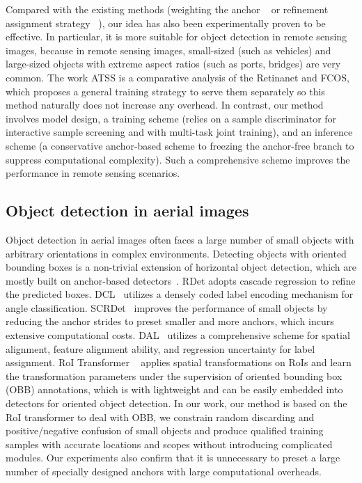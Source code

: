 \documentclass[journal]{IEEEtran}
\begin{document}
 Compared with the existing methods (weighting the anchor ~\cite{MetaAnchor, Zhu2020SoftAO} or refinement assignment strategy ~\cite{9009487, ming2020dynamic}), our idea has also been experimentally proven to be effective. In particular, it is more suitable for object detection in remote sensing images, because in remote sensing images, small-sized (such as vehicles) and large-sized objects with extreme aspect ratios (such as ports, bridges) are very common. The work ATSS \cite{2020Bridging} is a comparative analysis of the Retinanet and FCOS, which proposes a general training strategy to serve them separately so this method naturally does not increase any overhead. In contrast, our method involves model design, a training scheme (relies on a sample discriminator for interactive sample screening and with multi-task joint training), and an inference scheme (a conservative anchor-based scheme to freezing the anchor-free branch to suppress computational complexity). Such a comprehensive scheme improves the performance in remote sensing scenarios. 
 
\subsection{Object detection in aerial images} Object detection in aerial images often faces a large number of small objects with arbitrary orientations in complex environments. Detecting objects with oriented bounding boxes is a non-trivial extension of horizontal object detection, which are mostly built on anchor-based detectors~\cite{ma2018arbitrary,liu2016ship,liao2018textboxes++, ding2019learning}. 
RDet \cite{yang2019r3det} adopts cascade regression to refine the predicted boxes.  DCL~\cite{yang2020dense} utilizes a densely coded label encoding mechanism for angle classification. SCRDet~\cite{yang2019scrdet} improves the performance of small objects by reducing the anchor strides to preset smaller and more anchors, which incurs extensive computational costs.  DAL~\cite{ming2020dynamic} utilizes a comprehensive scheme for spatial alignment, feature alignment ability, and regression uncertainty for label assignment. RoI Transformer ~\cite{ding2019learning} applies spatial transformations on RoIs
and learn the transformation parameters under the supervision of oriented bounding box (OBB) annotations, which is with lightweight and can be easily embedded into detectors for oriented object detection. In our work, our method is based on the RoI transformer to deal with OBB, we constrain random discarding and positive/negative confusion of small objects and produce qualified training samples with accurate locations and scopes without introducing complicated modules. Our experiments also confirm that it is unnecessary to preset a large number of specially designed anchors with large computational overheads.
\end{document}
